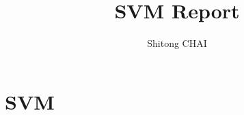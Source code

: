 \documentclass[a4paper,12pt]{report}
\title{SVM Report}
\date{}
\author{Shitong CHAI}
\begin{document}
\maketitle
\tableofcontents

\chapter {SVM\cite{Nobody06}}



{}

\end{document}

